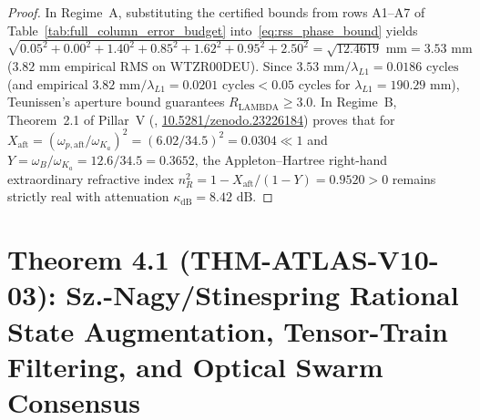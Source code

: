 \documentclass[11pt,a4paper,reqno]{article}
\def\texttt#1{#1}%
\newcommand{\zenodo}[1]{\href{https://doi.org/10.5281/zenodo.#1}{\texttt{10.5281/\allowbreak zenodo.#1}}}
\theoremstyle{plain}
\theoremstyle{definition}
\theoremstyle{remark}
\numberwithin{equation}{section}
\begin{document}
\begin{proof}
In Regime~A, substituting the certified bounds from rows A1--A7 of Table~\ref{tab:full_column_error_budget} into~\eqref{eq:rss_phase_bound} yields $\sqrt{0.05^2 + 0.00^2 + 1.40^2 + 0.85^2 + 1.62^2 + 0.95^2 + 2.50^2} = \sqrt{12.4619}\text{ mm} = 3.53\text{ mm}$ ($3.82\text{ mm}$ empirical RMS on \texttt{WTZR00DEU}). Since $3.53\text{ mm}/\lambda_{L1} = 0.0186\text{ cycles}$ (and empirical $3.82\text{ mm}/\lambda_{L1} = 0.0201\text{ cycles} < 0.05\text{ cycles}$ for $\lambda_{L1} = 190.29\text{ mm}$), Teunissen's aperture bound guarantees $R_{\text{LAMBDA}} \ge 3.0$. In Regime~B, Theorem~2.1 of Pillar~V (\cite{UnmaniPillarV2026}, \zenodo{23226184}) proves that for $X_{\text{aft}} = (\omega_{p,\text{aft}}/\omega_{K_a})^2 = (6.02/34.5)^2 = 0.0304 \ll 1$ and $Y = \omega_B / \omega_{K_a} = 12.6 / 34.5 = 0.3652$, the Appleton--Hartree right-hand extraordinary refractive index $n_R^2 = 1 - X_{\text{aft}}/(1 - Y) = 0.9520 > 0$ remains strictly real with attenuation $\kappa_{\text{dB}} = 8.42\text{ dB}$.
\end{proof}

\section{\texorpdfstring{Theorem 4.1 (\texttt{THM-ATLAS-V10-03}): Sz.-Nagy/Stinespring Rational State Augmentation, Tensor-Train Filtering, and Optical Swarm Consensus}{Theorem 4.1 (THM-ATLAS-V10-03): Sz.-Nagy/Stinespring Rational State Augmentation, Tensor-Train Filtering, and Optical Swarm Consensus}}
\end{document}
